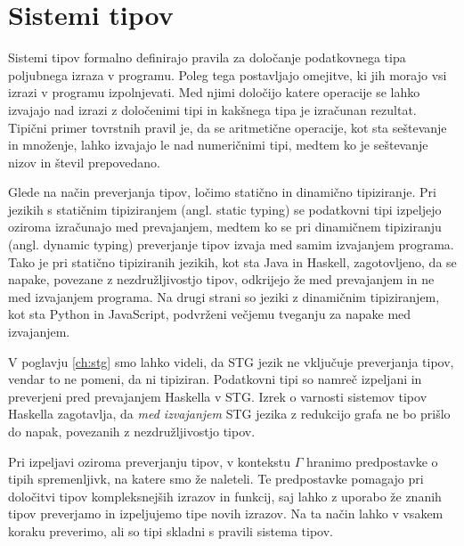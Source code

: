 \section{Sistemi tipov}
\label{sec:sistemi-tipov}

Sistemi tipov formalno definirajo pravila za določanje podatkovnega tipa poljubnega  izraza v programu. Poleg tega postavljajo omejitve, ki jih morajo vsi izrazi v programu izpolnjevati. Med njimi določijo katere operacije se lahko izvajajo nad izrazi z določenimi tipi in kakšnega tipa je izračunan rezultat. Tipični primer tovrstnih pravil je, da se aritmetične operacije, kot sta seštevanje in množenje, lahko izvajajo le nad numeričnimi tipi, medtem ko je seštevanje nizov in števil prepovedano.

Glede na način preverjanja tipov, ločimo statično in dinamično tipiziranje. Pri jezikih s statičnim tipiziranjem (angl. static typing) se podatkovni tipi izpeljejo oziroma izračunajo med prevajanjem, medtem ko se pri dinamičnem tipiziranju (angl. dynamic typing) preverjanje tipov izvaja med samim izvajanjem programa. Tako je pri statično tipiziranih jezikih, kot sta Java in Haskell, zagotovljeno, da se napake, povezane z nezdružljivostjo tipov, odkrijejo že med prevajanjem in ne med izvajanjem programa. Na drugi strani so jeziki z dinamičnim tipiziranjem, kot sta Python in JavaScript, podvrženi večjemu tveganju za napake med izvajanjem.

V poglavju \ref{ch:stg} smo lahko videli, da STG jezik ne vključuje preverjanja tipov, vendar to ne pomeni, da ni tipiziran. Podatkovni tipi so namreč izpeljani in preverjeni pred prevajanjem Haskella v STG. Izrek o varnosti sistemov tipov Haskella zagotavlja, da \textit{med izvajanjem} STG jezika z redukcijo grafa ne bo prišlo do napak, povezanih z nezdružljivostjo tipov.

Pri izpeljavi oziroma preverjanju tipov, v kontekstu $\Gamma$ hranimo predpostavke o tipih spremenljivk, na katere smo že naleteli. Te predpostavke pomagajo pri določitvi tipov kompleksnejših izrazov in funkcij, saj lahko z uporabo že znanih tipov preverjamo in izpeljujemo tipe novih izrazov. Na ta način lahko v vsakem koraku preverimo, ali so tipi skladni s pravili sistema tipov.

